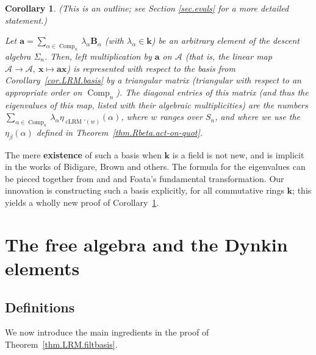 \documentclass[submission]{FPSAC2026}
\newtheorem{corollary}{Corollary}
\newcommand{\kk}{\mathbf{k}} %
\newcommand{\BB}{\mathbf{B}} %
\newcommand{\Comp}{\operatorname{Comp}}
\newcommand{\cLRM}{\operatorname{cLRM}}
\newcommand{\tup}[1]{\left( #1 \right)}
\begin{document}
\begin{corollary}
\label{cor.evals}
(This is an outline; see Section \ref{sec.evals} for a more
detailed statement.)

Let $\mathbf{a} = \sum_{\alpha \in \Comp_n} \lambda_\alpha \BB_\alpha$
(with $\lambda_\alpha \in \kk$) be an arbitrary element of the
descent algebra $\Sigma_n$.
Then, left multiplication by $\mathbf{a}$ on $\mathcal{A}$
(that is, the linear map $\mathcal{A}\to \mathcal{A},\ \mathbf{x}
\mapsto \mathbf{a}\mathbf{x}$) is represented with respect to the
basis from Corollary~\ref{cor.LRM.basis} by a triangular matrix
(triangular with respect to an appropriate order on $\Comp_n$).
The diagonal entries of this matrix (and thus the eigenvalues
of this map, listed with their algebraic multiplicities) are the
numbers
$\sum_{\alpha \in \Comp_n} \lambda_\alpha \eta_{\cLRM'(w)}\tup{\alpha}$,
where $w$ ranges over $S_n$, and where we use the
$\eta_\beta\tup{\alpha}$ defined in
Theorem~\ref{thm.Rbeta.act-on-quot}.
\end{corollary}

The mere \textbf{existence} of such a basis when $\kk$ is a field
is not new, and is implicit in the works of Bidigare, Brown and
others. The formula for the eigenvalues can
be pieced together from \cite[Proposition 4.2]{RSW2014} and
\cite[Corollary 4.1.3]{Bidigare-thesis} and Foata's fundamental
transformation. Our innovation is
constructing such a basis explicitly, for all commutative rings $\kk$;
this yields a wholly new proof of Corollary~\ref{cor.evals}.

\section{The free algebra and the Dynkin elements}
\label{sec.dynkin}


\subsection{Definitions}


We now introduce the main ingredients in the proof of
Theorem~\ref{thm.LRM.filtbasis}.
\end{document}
